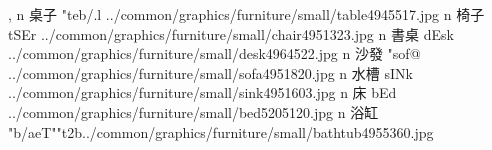\begin{tGe}{14}{, }
      {n} {桌子}  {}{"teb{/.l}}   {../common/graphics/furniture/small/table4945517.jpg}       {}
      {n} {椅子}  {}{tSEr}        {../common/graphics/furniture/small/chair4951323.jpg}       {}
       {n} {書桌}  {}{dEsk}        {../common/graphics/furniture/small/desk4964522.jpg}        {}
       {n} {沙發}  {}{"sof@}       {../common/graphics/furniture/small/sofa4951820.jpg}        {}
       {n} {水槽}  {}{sINk}        {../common/graphics/furniture/small/sink4951603.jpg}        {}
        {n} {床}    {}{bEd}         {../common/graphics/furniture/small/bed5205120.jpg}         {}
    {n} {浴缸}  {}{"b{/ae}T""t2b}{../common/graphics/furniture/small/bathtub4955360.jpg}     {}

\end{tGe}
